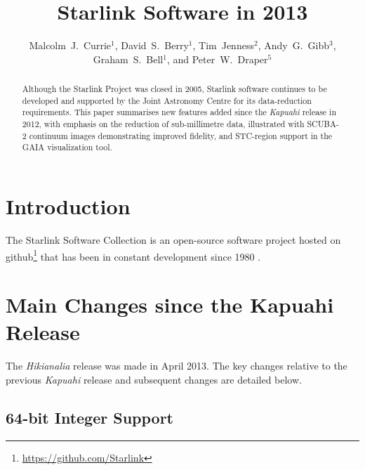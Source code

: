 \documentclass[11pt,twoside]{article}
\begin{document}
\title{Starlink Software in 2013}
\author{Malcolm~J.~Currie$^1$, David~S.~Berry$^1$, Tim~Jenness$^2$,
Andy~G.~Gibb$^3$, Graham~S.~Bell$^1$, and Peter~W.~Draper$^5$
}

\begin{abstract}
  Although the Starlink Project was closed in 2005, Starlink software
  continues to be developed and supported by the Joint Astronomy
  Centre for its data-reduction requirements. This paper summarises
  new features added since the \textit{Kapuahi} release in 2012, with
  emphasis on the reduction of sub-millimetre data, illustrated with
  SCUBA-2 continuum images demonstrating improved fidelity, and
  STC-region support in the GAIA visualization tool.
\end{abstract}

\section{Introduction}

The Starlink Software Collection is an open-source software project
hosted on github\footnote{\url{https://github.com/Starlink}} that has
been in constant development since 1980 \citep{1982QJRAS..23..485D}.

\section{Main Changes since the Kapuahi Release}

The \textit{Hikianalia} release was made in April 2013. The key
changes relative to the previous \textit{Kapuahi} release
\citep{P05_adassxxii} and subsequent changes are detailed below.

\subsection*{64-bit Integer Support}
\end{document}

